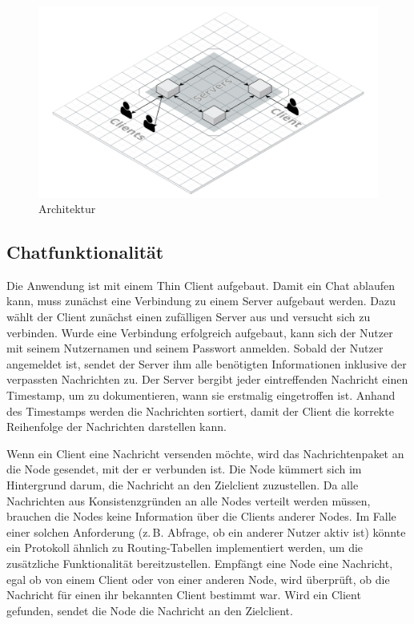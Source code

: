 
\begin{figure}[h]
    \centering
    \includegraphics[width=\textwidth]{architecture.png}
    
    \caption{Architektur}
\end{figure}

\author{Matthias Vonend}
\subsection{Chatfunktionalität}
Die Anwendung ist mit einem Thin Client aufgebaut. Damit ein Chat ablaufen kann, muss zunächst eine Verbindung zu einem Server aufgebaut werden.
Dazu wählt der Client zunächst einen zufälligen Server aus und versucht sich zu verbinden.
Wurde eine Verbindung erfolgreich aufgebaut, kann sich der Nutzer mit seinem Nutzernamen und seinem Passwort anmelden.
Sobald der Nutzer angemeldet ist, sendet der Server ihm alle benötigten Informationen inklusive der verpassten
Nachrichten zu. Der Server bergibt jeder eintreffenden Nachricht einen Timestamp, um zu dokumentieren, wann sie erstmalig eingetroffen ist.
Anhand des Timestamps werden die Nachrichten sortiert, damit der Client die korrekte Reihenfolge der Nachrichten darstellen kann.

Wenn ein Client eine Nachricht versenden möchte, wird das Nachrichtenpaket an die Node gesendet, mit der er verbunden ist.
Die Node kümmert sich im Hintergrund darum, die Nachricht an den Zielclient zuzustellen. 
Da alle Nachrichten aus Konsistenzgründen an alle Nodes verteilt werden müssen,
brauchen die Nodes keine Information über die Clients anderer Nodes. Im Falle einer solchen Anforderung
(z.\,B. Abfrage, ob ein anderer Nutzer aktiv ist) könnte ein Protokoll ähnlich zu Routing-Tabellen implementiert werden, um die zusätzliche Funktionalität bereitzustellen.
Empfängt eine Node eine Nachricht, egal ob von einem Client oder von einer anderen Node,
wird überprüft, ob die Nachricht für einen ihr bekannten Client bestimmt war. Wird ein Client gefunden, sendet die Node die Nachricht an den Zielclient.

